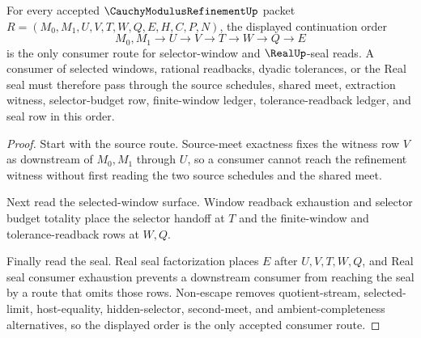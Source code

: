 \begin{theorem}
\label{thm:cauchy-modulus-refinement-cont-route-scope}
For every accepted $\CauchyModulusRefinementUp$ packet $R=(M_0,M_1,U,V,T,W,Q,E,H,C,P,N)$, the displayed continuation order
$$
M_0,M_1 \longrightarrow U \longrightarrow V \longrightarrow T \longrightarrow W \longrightarrow Q \longrightarrow E
$$
is the only consumer route for selector-window and $\RealUp$-seal reads. A consumer of selected windows, rational readbacks, dyadic tolerances, or the Real seal must therefore pass through the source schedules, shared meet, extraction witness, selector-budget row, finite-window ledger, tolerance-readback ledger, and seal row in this order.
\end{theorem}
\begin{proof}
Start with the source route. Source-meet exactness fixes the witness row $V$ as downstream of $M_0,M_1$ through $U$, so a consumer cannot reach the refinement witness without first reading the two source schedules and the shared meet.

Next read the selected-window surface. Window readback exhaustion and selector budget totality place the selector handoff at $T$ and the finite-window and tolerance-readback rows at $W,Q$.

Finally read the seal. Real seal factorization places $E$ after $U,V,T,W,Q$, and Real seal consumer exhaustion prevents a downstream consumer from reaching the seal by a route that omits those rows. Non-escape removes quotient-stream, selected-limit, host-equality, hidden-selector, second-meet, and ambient-completeness alternatives, so the displayed order is the only accepted consumer route.
\end{proof}

